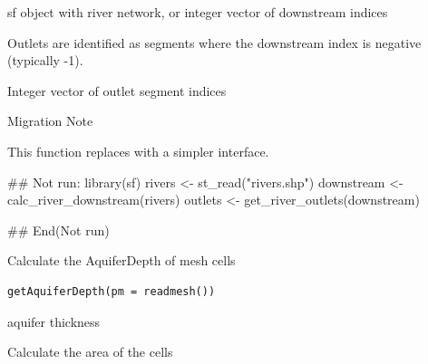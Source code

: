 \documentclass[a4paper]{book}
\begin{document}
%
\begin{Arguments}
\begin{ldescription}
\item[\code{rivers}] sf object with river network, or integer vector of downstream indices
\end{ldescription}
\end{Arguments}
%
\begin{Details}\relax
Outlets are identified as segments where the downstream index is negative
(typically -1).
\end{Details}
%
\begin{Value}
Integer vector of outlet segment indices
\end{Value}
%
\begin{Section}{Migration Note}

This function replaces  with a simpler interface.
\end{Section}
%
\begin{Examples}
\begin{ExampleCode}
## Not run: 
library(sf)
rivers <- st_read("rivers.shp")
downstream <- calc_river_downstream(rivers)
outlets <- get_river_outlets(downstream)

## End(Not run)
\end{ExampleCode}
\end{Examples}
%
\begin{Description}\relax
Calculate the AquiferDepth of mesh cells
\end{Description}
%
\begin{Usage}
\begin{verbatim}
getAquiferDepth(pm = readmesh())
\end{verbatim}
\end{Usage}
%
\begin{Arguments}
\begin{ldescription}
\item[\code{pm}] 
\end{ldescription}
\end{Arguments}
%
\begin{Value}
aquifer thickness
\end{Value}
%
\begin{Description}\relax
Calculate the area of the cells
\end{Description}
\end{document}
